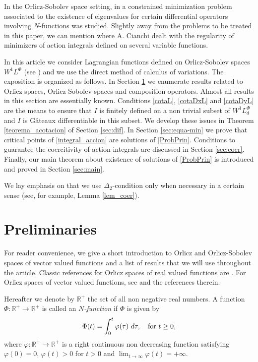 \documentclass[twoside]{elsarticle}
\theoremstyle{remark}
\newcommand{\lphi}{L^{\Phi}}
\begin{document}
  In the Orlicz-Sobolev space setting, 
	in \cite{m-1999} a constrained minimization problem associated to the existence of eigenvalues for certain differential operators involving $N$-functions was studied.  
Slightly away from the problems to be treated in this paper, 
we can mention \cite{cianchi2000local, cianchi1999gradient} where A. Cianchi dealt with 
the regularity of minimizers of action integrals defined on several variable functions.

In this article  we consider Lagrangian functions  defined on Orlicz-Sobolev spaces $W^{1}L^{\Phi}$    
(see \cite{adams_sobolev,KR, rao1991theory,2002applications}) 
and we use  the direct method of calculus of variations. 
The exposition is organized as follows. 
In Section \ref{preliminares} we enumerate results related to Orlicz spaces, Orlicz-Sobolev spaces and composition operators. 
Almost all results in this section  are essentially known. Conditions \eqref{cotaL}, \eqref{cotaDxL} and \eqref{cotaDyL} are the means to ensure that $I$ is finitely defined on 
a non trivial subset of $W^{1}\lphi_d$ and $I$ is G\^ateaux differentiable in this subset. We develop  these issues in Theorem \ref{teorema_acotacion}  of Section \ref{sec:dif}. In Section \ref{sec:equa-min} we prove that critical points of \eqref{integral_accion}
 are solutions of \eqref{ProbPrin}. Conditions to guarantee the coercitivity of action integrals are discussed in Section \ref{sec:coer}. Finally, our main theorem about existence of solutions of  \eqref{ProbPrin} is introduced and proved in Section \ref{sec:main}. 

We lay emphasis on that we use $\Delta_2$-condition only when 
necessary in a certain sense (see, for example, Lemma \ref{lem_coer}).
   




\section{Preliminaries}\label{preliminares}


For reader convenience, we give a short introduction to Orlicz and Orlicz-Sobolev spaces of vector valued functions and a  list  of results that we will use throughout the article. 
Classic references for Orlicz spaces of real valued functions are \cite{adams_sobolev,KR,rao1991theory}.
For  Orlicz spaces of vector valued functions, see \cite{Orliczvectorial2005} and the references therein.

Hereafter we denote  by $\mathbb{R}^+$  the set of all non negative real numbers. A function $\Phi:\mathbb{R}^+\to \mathbb{R}^+ $ is called an \emph{$N$-function} if $\Phi$ is given by 
\[
\Phi(t)=\int_{0}^t \varphi(\tau)\ d\tau,\quad\hbox{for } t\geq 0,
\]
where $\varphi:\mathbb{R}^+\rightarrow \mathbb{R}^+$ is a right continuous non decreasing function  satisfying   $\varphi(0)=0$, $\varphi(t)>0$ for $t>0$ and
$\lim_{t\rightarrow \infty}\varphi(t)=+\infty$.
\end{document}
